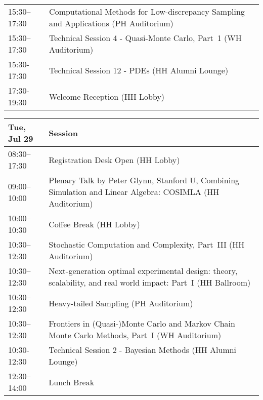 \begin{table}
{\begin{tabularx}{\textwidth}{>{\hsize=0.32\hsize}X|>{\hsize=1.7\hsize}X}
\cellcolor{\SessionTitleColor}15:30–17:30 & \cellcolor{\SessionTitleColor}Computational Methods for Low-discrepancy Sampling and Applications (PH Auditorium) \\
\cellcolor{\SessionLightColor}15:30–17:30 & \cellcolor{\SessionLightColor}Technical Session 4 - Quasi-Monte Carlo, Part~1 (WH Auditorium) \\
\cellcolor{\SessionLightColor}15:30-17:30 & \cellcolor{\SessionLightColor}Technical Session 12 - PDEs (HH Alumni Lounge) \\
\cellcolor{\EmptyColor}17:30-19:30 & \cellcolor{\EmptyColor}Welcome Reception (HH Lobby) \\
\hline
\end{tabularx}
}
\end{table}

\begin{table}
{\footnotesize
\begin{tabularx}{\textwidth}{>{\hsize=0.32\hsize}X|>{\hsize=1.7\hsize}X}
\hline
\textbf{Tue, Jul 29} & \textbf{Session} \\
\hline
\cellcolor{\EmptyColor}08:30–17:30 & \cellcolor{\EmptyColor}Registration Desk Open (HH Lobby) \\
\cellcolor{\PlenaryColor}09:00–10:00 & \cellcolor{\PlenaryColor}Plenary Talk by Peter Glynn, Stanford U, Combining Simulation and Linear Algebra: COSIMLA (HH Auditorium) \\
\cellcolor{\EmptyColor}10:00–10:30 & \cellcolor{\EmptyColor}Coffee Break (HH Lobby) \\
\cellcolor{\SessionTitleColor}10:30–12:30 & \cellcolor{\SessionTitleColor}Stochastic Computation and Complexity, Part~III (HH Auditorium) \\
\cellcolor{\SessionTitleColor}10:30–12:30 & \cellcolor{\SessionTitleColor}Next-generation optimal experimental design: theory, scalability, and real world impact: Part~I (HH Ballroom) \\
\cellcolor{\SessionTitleColor}10:30–12:30 & \cellcolor{\SessionTitleColor}Heavy-tailed Sampling (PH Auditorium) \\
\cellcolor{\SessionTitleColor}10:30–12:30 & \cellcolor{\SessionTitleColor}Frontiers in (Quasi-)Monte Carlo and Markov Chain Monte Carlo Methods, Part~I (WH Auditorium) \\
\cellcolor{\SessionLightColor}10:30-12:30 & \cellcolor{\SessionLightColor}Technical Session 2 - Bayesian Methods (HH Alumni Lounge) \\
\cellcolor{\EmptyColor}12:30–14:00 & \cellcolor{\EmptyColor}Lunch Break \\

\end{tabularx}}
\end{table}
